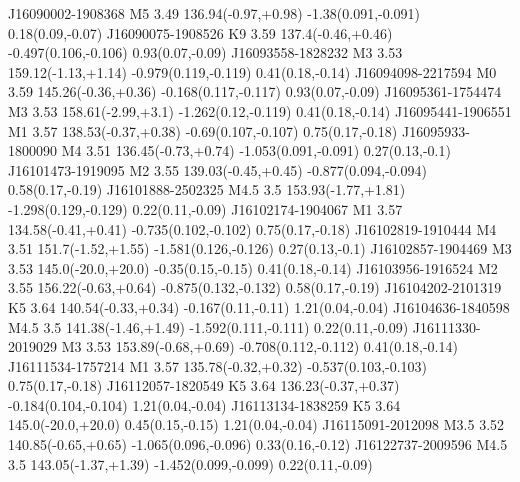 J16090002-1908368  M5     3.49                   136.94(-0.97,+0.98)  -1.38(0.091,-0.091)               0.18(0.09,-0.07)
J16090075-1908526  K9     3.59                   137.4(-0.46,+0.46)   -0.497(0.106,-0.106)              0.93(0.07,-0.09)
J16093558-1828232  M3     3.53                   159.12(-1.13,+1.14)  -0.979(0.119,-0.119)              0.41(0.18,-0.14)
J16094098-2217594  M0     3.59                   145.26(-0.36,+0.36)  -0.168(0.117,-0.117)              0.93(0.07,-0.09)
J16095361-1754474  M3     3.53                   158.61(-2.99,+3.1)   -1.262(0.12,-0.119)               0.41(0.18,-0.14)
J16095441-1906551  M1     3.57                   138.53(-0.37,+0.38)  -0.69(0.107,-0.107)               0.75(0.17,-0.18)
J16095933-1800090  M4     3.51                   136.45(-0.73,+0.74)  -1.053(0.091,-0.091)              0.27(0.13,-0.1)
J16101473-1919095  M2     3.55                   139.03(-0.45,+0.45)  -0.877(0.094,-0.094)              0.58(0.17,-0.19)
J16101888-2502325  M4.5   3.5                    153.93(-1.77,+1.81)  -1.298(0.129,-0.129)              0.22(0.11,-0.09)
J16102174-1904067  M1     3.57                   134.58(-0.41,+0.41)  -0.735(0.102,-0.102)              0.75(0.17,-0.18)
J16102819-1910444  M4     3.51                   151.7(-1.52,+1.55)   -1.581(0.126,-0.126)              0.27(0.13,-0.1)
J16102857-1904469  M3     3.53                   145.0(-20.0,+20.0)   -0.35(0.15,-0.15)                 0.41(0.18,-0.14)
J16103956-1916524  M2     3.55                   156.22(-0.63,+0.64)  -0.875(0.132,-0.132)              0.58(0.17,-0.19)
J16104202-2101319  K5     3.64                   140.54(-0.33,+0.34)  -0.167(0.11,-0.11)                1.21(0.04,-0.04)
J16104636-1840598  M4.5   3.5                    141.38(-1.46,+1.49)  -1.592(0.111,-0.111)              0.22(0.11,-0.09)
J16111330-2019029  M3     3.53                   153.89(-0.68,+0.69)  -0.708(0.112,-0.112)              0.41(0.18,-0.14)
J16111534-1757214  M1     3.57                   135.78(-0.32,+0.32)  -0.537(0.103,-0.103)              0.75(0.17,-0.18)
J16112057-1820549  K5     3.64                   136.23(-0.37,+0.37)  -0.184(0.104,-0.104)              1.21(0.04,-0.04)
J16113134-1838259  K5     3.64                   145.0(-20.0,+20.0)   0.45(0.15,-0.15)                  1.21(0.04,-0.04)
J16115091-2012098  M3.5   3.52                   140.85(-0.65,+0.65)  -1.065(0.096,-0.096)              0.33(0.16,-0.12)
J16122737-2009596  M4.5   3.5                    143.05(-1.37,+1.39)  -1.452(0.099,-0.099)              0.22(0.11,-0.09)

